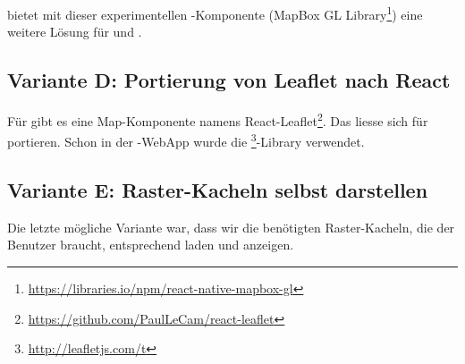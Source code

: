  bietet mit dieser experimentellen -Komponente (MapBox GL Library\footnote{\url{https://libraries.io/npm/react-native-mapbox-gl}}) eine weitere Lösung für  und .


\subsection{Variante D: Portierung von Leaflet nach React}

Für  gibt es eine Map-Komponente namens React-Leaflet\footnote{\url{https://github.com/PaulLeCam/react-leaflet}}. 
Das liesse sich für  portieren.
Schon in der \kort{}-\gls{WebApp} wurde die \footnote{\url{http://leafletjs.com/t}}-Library verwendet.

\subsection{Variante E: Raster-Kacheln selbst darstellen}

Die letzte mögliche Variante war, dass wir die benötigten Raster-Kacheln, die der Benutzer braucht, entsprechend laden und anzeigen.

